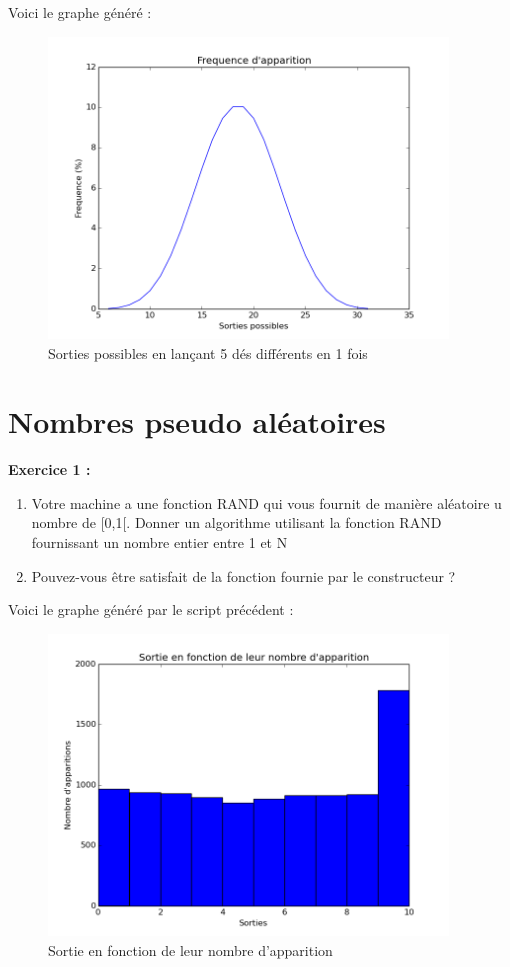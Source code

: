 \documentclass{book}
\begin{document}
Voici le graphe généré : 
\begin{figure}[h!]
	\centering
	\includegraphics[height=8cm]{lancer_de_5_des.png}
	\caption{Sorties possibles en lançant 5 dés différents en 1 fois}
\end{figure}
\section{Nombres pseudo aléatoires}
\textbf{Exercice 1 :}
\begin{enumerate}
	\item Votre machine a une fonction RAND qui vous fournit de manière aléatoire u nombre de [0,1[. Donner un algorithme utilisant la fonction RAND fournissant un nombre entier entre 1 et N
	\item Pouvez-vous être satisfait de la fonction fournie par le constructeur ?
\end{enumerate}

\newpage
Voici le graphe généré par le script précédent : 
\begin{figure}[h!]
	\centering
	\includegraphics[height=8cm]{Nombre_pseudo-aleatoires_exo1.png}
	\caption{Sortie en fonction de leur nombre d'apparition}
	\label{fig:cc40}
\end{figure}
\end{document}
